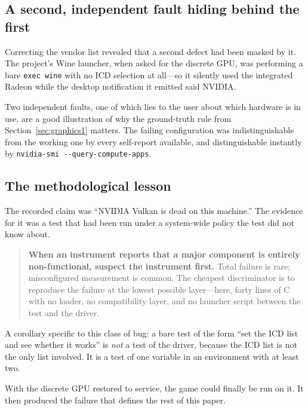 \subsection{A second, independent fault hiding behind the first}

Correcting the vendor list revealed that a second defect had been masked by it.
The project's Wine launcher, when asked for the discrete GPU, was performing a
bare \verb|exec wine| with no ICD selection at all---so it silently used the
integrated Radeon while the desktop notification it emitted said NVIDIA.

Two independent faults, one of which lies to the user about which hardware is in
use, are a good illustration of why the ground-truth rule from
Section~\ref{sec:graphics1} matters. The failing configuration was
indistinguishable from the working one by every self-report available, and
distinguishable instantly by \verb|nvidia-smi --query-compute-apps|.

\subsection{The methodological lesson}

The recorded claim was ``NVIDIA Vulkan is dead on this machine.'' The evidence
for it was a test that had been run under a system-wide policy the test did not
know about.

\begin{quote}
\textbf{When an instrument reports that a major component is entirely
non-functional, suspect the instrument first.} Total failure is rare; misconfigured
measurement is common. The cheapest discriminator is to reproduce the failure at
the lowest possible layer---here, forty lines of C with no loader, no
compatibility layer, and no launcher script between the test and the driver.
\end{quote}

A corollary specific to this class of bug: a bare test of the form ``set the ICD
list and see whether it works'' is \emph{not} a test of the driver, because the
ICD list is not the only list involved. It is a test of one variable in an
environment with at least two.

With the discrete GPU restored to service, the game could finally be run on it.
It then produced the failure that defines the rest of this paper.
